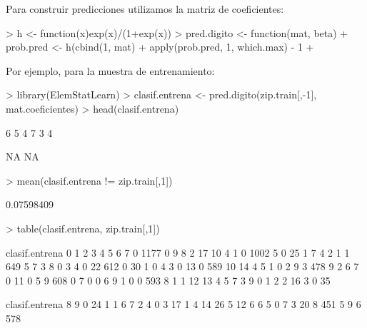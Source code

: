 \documentclass[nohyper]{tufte-handout}
\begin{document}
Para construir predicciones utilizamos la matriz de coeficientes:
\begin{Schunk}
\begin{Sinput}
> h <- function(x){exp(x)/(1+exp(x))}
> pred.digito <- function(mat, beta){
+    prob.pred <- h(cbind(1, mat)%*%beta)
+    apply(prob.pred, 1, which.max) - 1
+ }
\end{Sinput}
\end{Schunk}

Por ejemplo, para la muestra de entrenamiento:

\begin{Schunk}
\begin{Sinput}
> library(ElemStatLearn)
> clasif.entrena <- pred.digito(zip.train[,-1], mat.coeficientes)
> head(clasif.entrena)
\end{Sinput}
\begin{Soutput}
[1] 6 5 4 7 3 4
\end{Soutput}
\end{Schunk}

NA
NA

\begin{Schunk}
\begin{Sinput}
> mean(clasif.entrena != zip.train[,1])
\end{Sinput}
\begin{Soutput}
[1] 0.07598409
\end{Soutput}
\begin{Sinput}
> table(clasif.entrena, zip.train[,1])
\end{Sinput}
\begin{Soutput}
clasif.entrena    0    1    2    3    4    5    6    7
             0 1177    0    9    8    2   17   10    4
             1    0 1002    5    0   25    1    7    4
             2    1    1  649    5    7    3    8    0
             3    4    0   22  612    0   30    1    0
             4    3    0   13    0  589   10   14    4
             5    1    0    2    9    3  478    9    2
             6    7    0   11    0    5    9  608    0
             7    0    0    6    9    1    0    0  593
             8    1    1   12   13    4    5    7    3
             9    0    1    2    2   16    3    0   35
              
clasif.entrena    8    9
             0   24    1
             1    6    7
             2    4    0
             3   17    1
             4   14   26
             5   12    6
             6    5    0
             7    3   20
             8  451    5
             9    6  578
\end{Soutput}
\end{Schunk}
\end{document}

